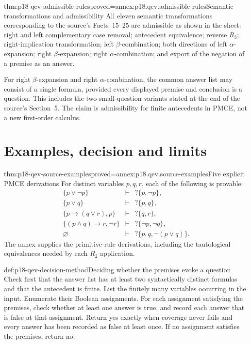 \begin{hbtheorem}{thm:p18-qev-admissible-rules}{proved=annex:p18.qev.admissible-rules}{Semantic transformations and admissibility}
All eleven semantic transformations corresponding to the source's
Facts~15--25 are admissible as shown in the sheet: right and left
complementary case removal; antecedent equivalence; reverse \(R_3\);
right-implication transformation; left \(\beta\)-combination;
both directions of left \(\alpha\)-expansion; right
\(\beta\)-expansion; right \(\alpha\)-combination; and export of
the negation of a premise as an answer.

For right \(\beta\)-expansion and right \(\alpha\)-combination,
the common answer list may consist of a single formula, provided every
displayed premise and conclusion is a question. This includes the two
small-question variants stated at the end of the source's Section~5.
The claim is admissibility for finite antecedents in PMCE, not a new
first-order calculus.
\end{hbtheorem}

\section{Examples, decision and limits}

\begin{hbtheorem}{thm:p18-qev-source-examples}{proved=annex:p18.qev.source-examples}{Five explicit PMCE derivations}
For distinct variables \(p,q,r\), each of the following is provable:
\[
\begin{array}{rcl}
 \{p\lor\neg p\}&\vdash&?\{p,\neg p\},\\
 \{p\lor q\}&\vdash&?\{p,q\},\\
 \{p\to(q\lor r),p\}&\vdash&?\{q,r\},\\
 \{(p\land q)\to r,\neg r\}&\vdash&?\{\neg p,\neg q\},\\
 \varnothing&\vdash&?\{p,q,\neg(p\lor q)\}.
\end{array}
\]
The annex supplies the primitive-rule derivations, including the
tautological equivalences needed by each \(R_2\) application.
\end{hbtheorem}

\begin{hbmethod}{def:p18-qev-decision-method}{Deciding whether the premises evoke a question}
Check first that the answer list has at least two syntactically distinct
formulas and that the antecedent is finite. List the finitely many
variables occurring in the input. Enumerate their Boolean assignments.
For each assignment satisfying the premises, check whether at least
one answer is true, and record each answer that is false at that
assignment. Return yes exactly when coverage never fails and every
answer has been recorded as false at least once. If no assignment
satisfies the premises, return no.
\end{hbmethod}

